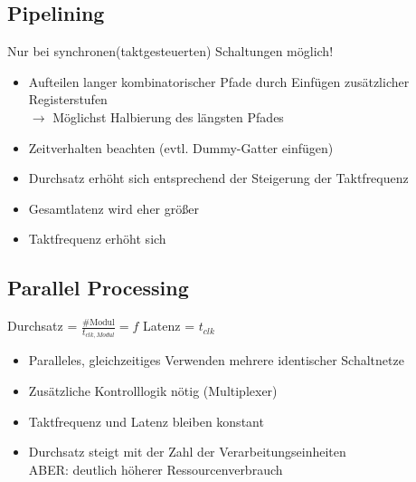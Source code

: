 \documentclass[6pt,a4paper]{scrartcl}
\newcommand{\ra}[0]{\ensuremath{\rightarrow}} 									%
\begin{document}
\begin{multicols*}{3}
	\subsection{Pipelining} %
	Nur bei synchronen(taktgesteuerten) Schaltungen möglich!
	\begin{itemize} \itemsep0pt
		\item Aufteilen langer kombinatorischer Pfade durch Einfügen zusätzlicher Registerstufen\\
		$\ra$ Möglichst Halbierung des längsten Pfades
		\item Zeitverhalten beachten (evtl. Dummy-Gatter einfügen)
		\item Durchsatz erhöht sich entsprechend der Steigerung der Taktfrequenz
		\item Gesamtlatenz wird eher größer
		\item Taktfrequenz erhöht sich
	\end{itemize}

	\subsection{Parallel Processing} %

	Durchsatz = $\frac{\#\text{Modul}}{t_{clk,Modul}} = f$ \qquad \quad Latenz = $t_{clk}$
	\begin{itemize} \itemsep0pt
		\item Paralleles, gleichzeitiges Verwenden mehrere identischer Schaltnetze
		\item Zusätzliche Kontrolllogik nötig (Multiplexer)
		\item Taktfrequenz und Latenz bleiben konstant
		\item Durchsatz steigt mit der Zahl der Verarbeitungseinheiten \\
		ABER: deutlich höherer Ressourcenverbrauch
	\end{itemize}



\end{multicols*}
\end{document}
